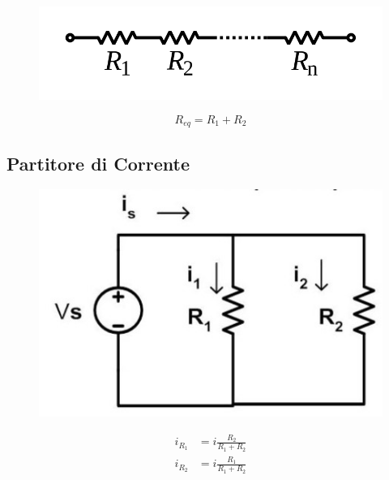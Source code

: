 \documentclass[fontsize=8pt]{scrartcl}
\begin{document}
\begin{multicols*}{2}
\begin{minipage}[m]{.45\linewidth}
    \begin{figure}[H]
        \centering
        \includegraphics[width=.8\linewidth]{images/serie.png}
    \end{figure}
\end{minipage}
\begin{minipage}[m]{.45\linewidth}
    \begin{equation*}
        R_{eq}=R_1+R_2
    \end{equation*}
\end{minipage}

\subsection*{Partitore di Corrente}

\begin{minipage}[m]{.45\linewidth}
    \begin{figure}[H]
        \centering
        \includegraphics[width=.8\linewidth]{images/partitore_corrente.jpg}
    \end{figure}
\end{minipage}
\begin{minipage}[m]{.45\linewidth}
    \begin{align*}
        i_{R_1} &= i\frac{R_2}{R_1+R_2}\\
        i_{R_2} &= i\frac{R_1}{R_1+R_2}
    \end{align*}
\end{minipage}


\end{multicols*}
\end{document}
